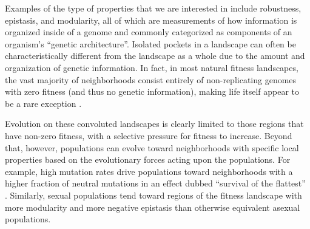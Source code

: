 \documentclass[PhD]{msu-thesis}
\begin{document}
Examples of the type of properties that we are interested in include robustness, epistasis, and modularity, all of which are measurements of how information is organized inside of a genome and commonly categorized as components of an organism's ``genetic architecture''. Isolated pockets in a landscape can often be characteristically different from the landscape as a whole due to the amount and organization of genetic information.  In fact, in most natural fitness landscapes, the vast majority of neighborhoods consist entirely of non-replicating genomes with zero fitness (and thus no genetic information), making life itself appear to be a rare exception \cite{gavrilets_fitness_2004}.

Evolution on these convoluted landscapes is clearly limited to those regions that have non-zero fitness, with a selective pressure for fitness to increase. Beyond that, however, populations can evolve toward neighborhoods with specific local properties based on the evolutionary forces acting upon the populations.  For example, high mutation rates drive populations toward neighborhoods with a higher fraction of neutral mutations in an effect dubbed “survival of the flattest” \cite{wilke_evolution_2001}. Similarly, sexual populations tend toward regions of the fitness landscape with more modularity \cite{misevic_sexual_2006} and more negative epistasis \cite{misevic_experiments_2010} than otherwise equivalent asexual populations.
\end{document}
